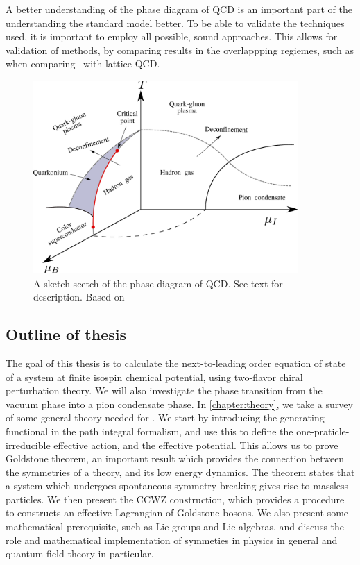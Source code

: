 A better understanding of the phase diagram of QCD is an important part of the understanding the standard model better.
To be able to validate the techniques used, it is important to employ all possible, sound approaches.
This allows for validation of methods, by comparing results in the overlappping regiemes, such as when comparing \chpt\ with lattice QCD.

\begin{figure}[h]
    \centering
    \includegraphics[width=0.9\textwidth]{figurer/phase_diagram2.pdf}
    \caption{A sketch scetch of the phase diagram of QCD. See text for description. Based on~\cite{from_hadrons_to_quarks,
    Brandt:QCD_phase_diagram_with_isospin_chemical_potential,Brandt:QCD_phase_diagram_for_nonzero_isospin-asymmetry,Fukushima:The_phase_diagram_of_dense_QCD,mannarelli:meson_condensation}
    }
    \label{fig:phase diag qcd}
\end{figure}

\subsection*{Outline of thesis}
The goal of this thesis is to calculate the next-to-leading order equation of state of a system at finite isospin chemical potential, using two-flavor chiral perturbation theory.
We will also investigate the phase transition from the vacuum phase into a pion condensate phase.
In \autoref{chapter:theory}, we take a survey of some general theory needed for \chpt.
We start by introducing the generating functional in the path integral formalism, and use this to define the one-praticle-irreducible effective action, and the effective potential.
This allows us to prove Goldstone theorem, an important result which provides the connection between the symmetries of a theory, and its low energy dynamics.
The theorem states that a system which undergoes spontaneous symmetry breaking gives rise to massless particles.
We then present the CCWZ construction, which provides a procedure to constructs an effective Lagrangian of Goldstone bosons.
We also present some mathematical prerequisite, such as Lie groups and Lie algebras, and discuss the role and mathematical implementation of symmeties in physics in general and quantum field theory in particular.

